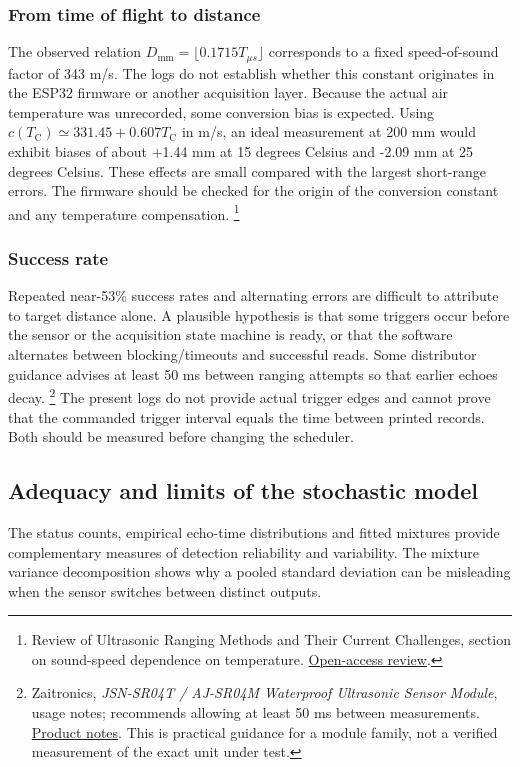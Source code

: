 \documentclass[11pt,a4paper]{article}
\begin{document}
\subsubsection{From time of flight to distance}
\label{sec:org0a567d6}
The observed relation \(D_{\mathrm{mm}}=\lfloor0.1715T_{\mu s}\rfloor\)
corresponds to a fixed speed-of-sound factor of 343 m/s. The logs do
not establish whether this constant originates in the ESP32 firmware
or another acquisition layer. Because the actual air temperature was
unrecorded, some conversion bias is expected. Using
\(c(T_{\mathrm C})\simeq331.45+0.607T_{\mathrm C}\) in m/s, an ideal
measurement at 200 mm would exhibit biases of about +1.44 mm at
15 degrees Celsius and -2.09 mm at 25 degrees Celsius. These effects
are small compared with the largest short-range errors. The firmware
should be checked for the origin of the conversion constant and any
temperature compensation. \footnote{Review of Ultrasonic Ranging Methods and Their Current Challenges,
section on sound-speed dependence on temperature. \href{https://pmc.ncbi.nlm.nih.gov/articles/PMC9025471/}{Open-access review}.}
\subsubsection{Success rate}
\label{sec:orgb0351eb}
Repeated near-53\% success rates and alternating errors are difficult to attribute to target distance alone. A plausible hypothesis is that some triggers occur before the sensor or the acquisition state machine is ready, or that the software alternates between blocking/timeouts and successful reads. Some distributor guidance advises at least 50 ms between ranging attempts so that earlier echoes decay. \footnote{Zaitronics, \emph{JSN-SR04T / AJ-SR04M Waterproof Ultrasonic Sensor Module},
usage notes; recommends allowing at least 50 ms between measurements.
\href{https://zaitronics.com.au/collections/distance-proximity-sensors/products/jsn-sr04t-aj-sr04m-waterproof-ultrasonic-distance-sensor}{Product notes}. This is practical guidance for a module family, not a
verified measurement of the exact unit under test.} The present logs do not provide actual trigger edges and cannot prove that the commanded trigger interval equals the time between printed records. Both should be measured before changing the scheduler.
\subsection{Adequacy and limits of the stochastic model}
\label{sec:orgd2b9d1a}
The status counts, empirical echo-time distributions and fitted mixtures
provide complementary measures of detection reliability and variability.
The mixture variance decomposition shows why a pooled standard deviation
can be misleading when the sensor switches between distinct outputs.
\end{document}
